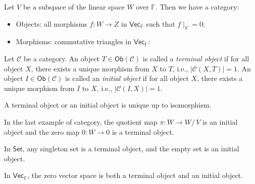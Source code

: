 \documentclass[
	11pt, %
	fleqn, %
	a4paper, %
]{LegrandOrangeBook}
\newcommand{\quotient}[2]{#1/\, #2} %
\newcommand{\F}{\mathbb{F}} %
\newcommand{\C}{\mathcal{C}} %
\newcommand{\Set}{\boldsymbol{\mathsf{Set}}} %
\newcommand{\Vect}{\boldsymbol{\mathsf{Vec}}} %
\newcommand{\Ob}[1]{\mathsf{Ob}(#1)} %
\begin{document}
\begin{example}
    Let $V$ be a subspace of the linear space $W$ over $\F$. Then we have a category:
    \begin{itemize}
        \item Objects: all morphisms $f : W \to Z$ in $\Vect_{\F}$ such that $f\mid_V = 0$;
        \item Morphisms: commutative triangles in $\Vect_{\F}$:
        \begin{center}
        \end{center}
    \end{itemize}
\end{example}

\begin{definition}
    Let $\C$ be a category. An object $T \in \Ob{\C}$ is called a \emph{terminal object} if for all object $X$, there exists a unique morphism from $X$ to $T$, i.e., $|\C(X, T)| = 1$. An object $I \in \Ob{\C}$ is called an \emph{initial object} if for all object $X$, there exists a unique morphism from $I$ to $X$, i.e., $|\C(I, X)| = 1$.
\end{definition}

\begin{corollary}
    A terminal object or an initial object is unique up to isomorphism.
\end{corollary}

\begin{example}
    In the last example of category, the quotient map $\pi : W \to \quotient{W}{V}$ is an initial object and the zero map $0 : W \to 0$ is a terminal object.
\end{example}

\begin{example}
    In $\Set$, any singleton set is a terminal object, and the empty set is an initial object.
\end{example}

\begin{example}
    In $\Vect_{\F}$, the zero vector space is both a terminal object and an initial object.
\end{example}

\newpage
\end{document}
